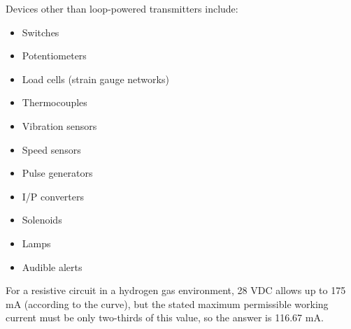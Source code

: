 Devices other than loop-powered transmitters include:

\begin{itemize}
\item{} Switches
\item{} Potentiometers
\item{} Load cells (strain gauge networks)
\item{} Thermocouples
\item{} Vibration sensors
\item{} Speed sensors
\item{} Pulse generators
\item{} I/P converters
\item{} Solenoids
\item{} Lamps
\item{} Audible alerts
\end{itemize}

\vskip 10pt

For a resistive circuit in a hydrogen gas environment, 28 VDC allows up to 175 mA (according to the curve), but the stated maximum permissible working current must be only two-thirds of this value, so the answer is 116.67 mA.




